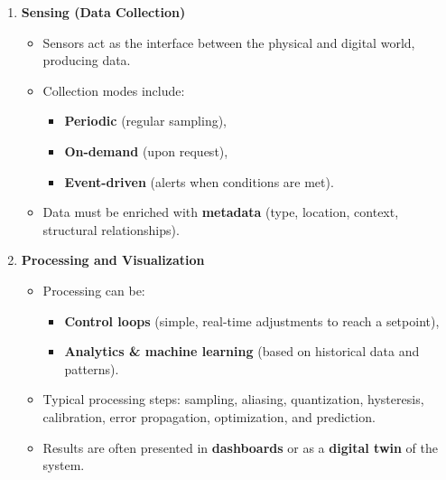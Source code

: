 \begin{enumerate}
    \item \textbf{Sensing (Data Collection)}
    
    \begin{itemize}
        \item Sensors act as the interface between the physical and digital world, producing data.
        
        \item Collection modes include:
        
        \begin{itemize}
            \item \textbf{Periodic} (regular sampling),
            
            \item \textbf{On-demand} (upon request),
            
            \item \textbf{Event-driven} (alerts when conditions are met).
        \end{itemize}
        
        \item Data must be enriched with \textbf{metadata} (type, location, context, structural relationships).
    \end{itemize}
    
    \item \textbf{Processing and Visualization}
    
    \begin{itemize}
        \item Processing can be:
        
        \begin{itemize}
            \item \textbf{Control loops} (simple, real-time adjustments to reach a setpoint),
            
            \item \textbf{Analytics \& machine learning} (based on historical data and patterns).
        \end{itemize}
        
        \item Typical processing steps: sampling, aliasing, quantization, hysteresis, calibration, error propagation, optimization, and prediction.
        
        \item Results are often presented in \textbf{dashboards} or as a \textbf{digital twin} of the system.
    \end{itemize}
    

\end{enumerate}
